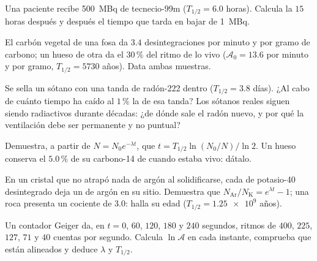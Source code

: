 \begin{exercise}[$\star\star$]\label{exo:g12:radioactive-decay:9}
Una paciente recibe \qty{500}{MBq} de tecnecio-99m ($T_{1/2} = 6.0$ horas). Calcula la
 $15$ horas después y después el tiempo que tarda en bajar de \qty{1}{MBq}.
\end{exercise}

\begin{exercise}[$\star\star$]\label{exo:g12:radioactive-decay:10}
El carbón vegetal de una fosa da $3.4$ desintegraciones por minuto y por gramo de
carbono; un hueso de otra da el $30\,\%$ del ritmo de lo vivo
($\mathcal A_0 = 13.6$ por minuto y por gramo, $T_{1/2} = \num{5730}$ años). Data
ambas muestras.
\end{exercise}

\begin{exercise}[$\star\star$]\label{exo:g12:radioactive-decay:11}
Se sella un sótano con una tanda de radón-222 dentro ($T_{1/2} = 3.8$ días). ¿Al cabo
de cuánto tiempo ha caído al $1\,\%$ la  de esa tanda? Los sótanos reales
siguen siendo radiactivos durante décadas: ¿de dónde sale el radón nuevo, y por qué la
ventilación debe ser permanente y no puntual?
\end{exercise}

\begin{exercise}[$\star\star\star$]\label{exo:g12:radioactive-decay:12}
Demuestra, a partir de $N = N_0 e^{-\lambda t}$, que
$t = T_{1/2}\ln(N_0/N)/\ln 2$. Un hueso conserva el $5.0\,\%$ de su carbono-14 de
cuando estaba vivo: dátalo.
\end{exercise}

\begin{exercise}[$\star\star\star$]\label{exo:g12:radioactive-decay:13}
En un cristal que no atrapó nada de argón al solidificarse, cada  de potasio-40
desintegrado deja un  de argón en su sitio. Demuestra que
$N_{\mathrm{Ar}}/N_{\mathrm K} = e^{\lambda t} - 1$; una roca presenta un cociente de
$3.0$: halla su edad ($T_{1/2} = \num{1.25e9}$ años).
\end{exercise}

\begin{exercise}[$\star\star\star$]\label{exo:g12:radioactive-decay:14}
Un contador Geiger da, en $t = 0$, $60$, $120$, $180$ y $240$ segundos, ritmos de
$400$, $225$, $127$, $71$ y $40$ cuentas por segundo. Calcula $\ln \mathcal A$ en cada
instante, comprueba que están alineados y deduce $\lambda$ y $T_{1/2}$.
\end{exercise}

